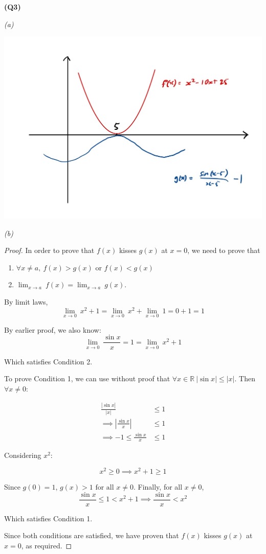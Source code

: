 \documentclass[12pt, a4paper]{article}
\newcommand{\R}{\mathbb{R}}
\newcommand{\displim}[1]{\displaystyle{\lim_{#1}\:}}
\begin{document}
\textbf{(Q3)}

\textit{(a)}

\includegraphics[width=\textwidth]{q3.jpg}

\newpage

\textit{(b)}

\begin{proof}
    In order to prove that $f(x)$ kisses $g(x)$ at $x = 0$, we need to prove that

    \begin{enumerate}
        \item $\forall x \neq a, \: f(x) > g(x)$ or $f(x) < g(x)$
        \item $\displim{x \to a} f(x) = \displim{x \to a} g(x)$.
    \end{enumerate}

    By limit laws,
    \[
        \displim{x \to 0} x^2 + 1 = \displim{x \to 0} x^2 + \displim{x \to 0} 1
        = 0 + 1 = 1
    \]

    By earlier proof, we also know:
    \[
        \displim{x \to 0} \frac{\sin x}{x} = 1 = \displim{x \to 0} x^2 + 1
    \]

    Which satisfies Condition 2.

    To prove Condition 1, we can use without proof that $\forall x \in \R\: |\sin x| \leq |x|$.
    Then $\forall x \neq 0$:

    \begin{align*}
        \frac{|\sin x|}{|x|} & \leq 1\\
        \implies \left|\frac{\sin x}{x}\right| & \leq 1\\
        \implies -1 \leq \frac{\sin x}{x} & \leq 1
    \end{align*}

    Considering $x^2$:

    \[
        x^2 \geq 0 \implies x^2 + 1 \geq 1
    \]

    Since $g(0) = 1$, $g(x) > 1 \text{ for all } x \neq 0$. Finally, for all $x \neq 0$,
    \[
        \frac{\sin x}{x} \leq 1 < x^2 + 1 \implies \frac{\sin x}{x} < x^2
    \]

    Which satisfies Condition 1.

    Since both conditions are satisfied, we have proven that $f(x)$ kisses $g(x)$ at $x = 0$, as required.
\end{proof}
\end{document}
